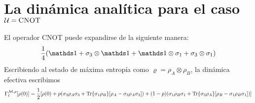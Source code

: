 \section{La dinámica analítica para el caso $\mathcal{U}=\textsc{CNOT}$}
El operador \textsc{CNOT} puede expandirse de la siguiente manera:
\begin{equation*}
    \frac{1}{4}(\Id+\sigma_{3}\otimes\Id+\Id\otimes\sigma_{1}+\sigma_{3}\otimes\sigma_{1})
\end{equation*}
Escribiendo al estado de máxima entropía como $\varrho=\rho_{A}\otimes\rho_{B}$, la dinámica efectiva escribimos
\begin{equation*}
    \Gamma_{t}^{\mathcal{M},\rho}[\rho(0)]=\frac{1}{2}[\rho(0)+p(\sigma_{3}\rho_{A}\sigma_{3}+\Tr{\sigma_{1}\rho_{B}}[\rho_{A}-\sigma_{3}\rho_{A}\sigma_{3}])+(1-p)(\sigma_{1}\rho_{B}\sigma_{1}+\Tr{\sigma_{3}\rho_{A}}[\rho_{B}-\sigma_{1}\rho_{B}\sigma_{1}])]
\end{equation*}